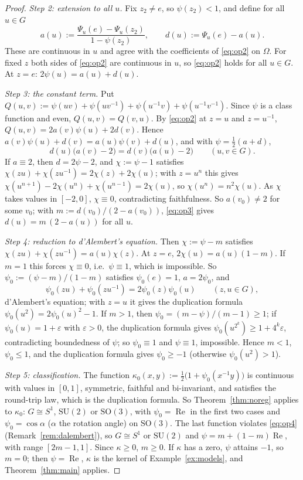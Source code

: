 \documentclass[11pt,reqno]{amsart}
\theoremstyle{definition}
\theoremstyle{remark}
\numberwithin{equation}{section}
\newcommand{\re}{\operatorname{Re}}
\newcommand{\SU}{\mathrm{SU}}
\newcommand{\SO}{\mathrm{SO}}
\begin{document}
\begin{proof}
\emph{Step 2: extension to all $u$.}  Fix $z_2\ne e$, so $\psi(z_2)<1$, and define for all $u\in G$
\[
a(u):=\frac{\Psi_u(e)-\Psi_u(z_2)}{1-\psi(z_2)},\qquad d(u):=\Psi_u(e)-a(u).
\]
These are continuous in $u$ and agree with the coefficients of \eqref{eq:op2} on $\Omega$.  For fixed $z$ both sides
of \eqref{eq:op2} are continuous in $u$, so \eqref{eq:op2} holds for all $u\in G$.  At $z=e$: $2\psi(u)=a(u)+d(u)$.

\emph{Step 3: the constant term.}  Put $Q(u,v):=\psi(uv)+\psi(uv^{-1})+\psi(u^{-1}v)+\psi(u^{-1}v^{-1})$.  Since $\psi$ is a
class function and even, $Q(u,v)=Q(v,u)$.  By \eqref{eq:op2} at $z=u$ and $z=u^{-1}$, $Q(u,v)=2a(v)\psi(u)+2d(v)$.  Hence
$a(v)\psi(u)+d(v)=a(u)\psi(v)+d(u)$, and with $\psi=\tfrac12(a+d)$,
\begin{equation}\label{eq:op3}
d(u)\bigl(a(v)-2\bigr)=d(v)\bigl(a(u)-2\bigr)\qquad(u,v\in G).
\end{equation}
If $a\equiv2$, then $d=2\psi-2$, and $\chi:=\psi-1$ satisfies $\chi(zu)+\chi(zu^{-1})=2\chi(z)+2\chi(u)$; with $z=u^n$ this
gives $\chi(u^{n+1})-2\chi(u^n)+\chi(u^{n-1})=2\chi(u)$, so $\chi(u^n)=n^2\chi(u)$.  As $\chi$ takes values in $[-2,0]$,
$\chi\equiv0$, contradicting faithfulness.  So $a(v_0)\ne2$ for some $v_0$; with $m:=d(v_0)/(2-a(v_0))$,
\eqref{eq:op3} gives $d(u)=m\,(2-a(u))$ for all $u$.

\emph{Step 4: reduction to d'Alembert's equation.}  Then $\chi:=\psi-m$ satisfies $\chi(zu)+\chi(zu^{-1})=a(u)\chi(z)$.  At
$z=e$, $2\chi(u)=a(u)(1-m)$.  If $m=1$ this forces $\chi\equiv0$, i.e.\ $\psi\equiv1$, which is impossible.  So
$\psi_0:=(\psi-m)/(1-m)$ satisfies $\psi_0(e)=1$, $a=2\psi_0$, and
\begin{equation}\label{eq:op4}
\psi_0(zu)+\psi_0(zu^{-1})=2\psi_0(z)\psi_0(u)\qquad(z,u\in G),
\end{equation}
d'Alembert's equation; with $z=u$ it gives the duplication formula $\psi_0(u^2)=2\psi_0(u)^2-1$.  If $m>1$, then
$\psi_0=(m-\psi)/(m-1)\ge1$; if $\psi_0(u)=1+\varepsilon$ with $\varepsilon>0$, the duplication formula gives
$\psi_0(u^{2^k})\ge1+4^k\varepsilon$, contradicting boundedness of $\psi$; so $\psi_0\equiv1$ and $\psi\equiv1$, impossible.  Hence
$m<1$, $\psi_0\le1$, and the duplication formula gives $\psi_0\ge-1$ (otherwise $\psi_0(u^2)>1$).

\emph{Step 5: classification.}  The function $\kappa_0(x,y):=\tfrac12\bigl(1+\psi_0(x^{-1}y)\bigr)$ is continuous with values
in $[0,1]$, symmetric, faithful and bi-invariant, and satisfies the round-trip law, which is the duplication formula.  So
Theorem~\ref{thm:noreg} applies to $\kappa_0$: $G\cong S^1$, $\SU(2)$ or $\SO(3)$, with $\psi_0=\re$ in the first two cases
and $\psi_0=\cos\alpha$ ($\alpha$ the rotation angle) on $\SO(3)$.  The
last function violates \eqref{eq:op4} (Remark~\ref{rem:dalembert}), so $G\cong S^1$ or $\SU(2)$ and
$\psi=m+(1-m)\re$, with range $[2m-1,1]$.  Since $\kappa\ge0$, $m\ge0$.  If $\kappa$ has a zero, $\psi$ attains $-1$, so
$m=0$; then $\psi=\re$, $\kappa$ is the kernel of Example~\ref{ex:models}, and Theorem~\ref{thm:main} applies.
\end{proof}
\end{document}
